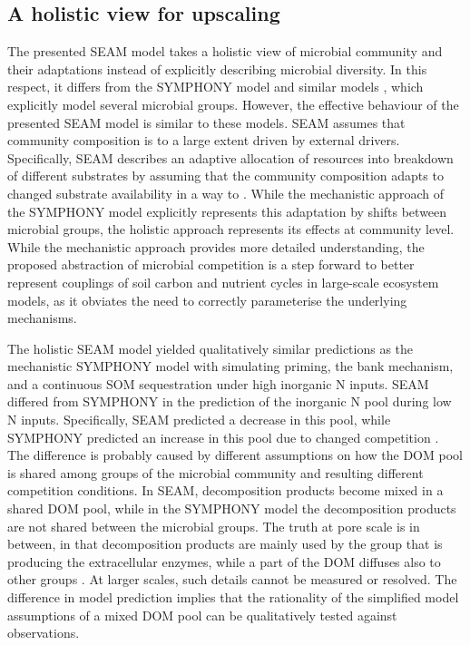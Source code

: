 \subsection{A holistic view for upscaling}
\label{sec:Holistic}

The presented SEAM model takes a holistic view \citep{Panikov10} of microbial
community and their adaptations instead of explicitly describing microbial
diversity.
In this respect, it differs from the SYMPHONY model \citep{Perveen14} and
similar models \citep{Fontaine03}, which explicitly model several microbial
groups.
However, the effective behaviour of the presented SEAM model is similar to these
models.
SEAM assumes that community composition is to a large extent driven by external
drivers. Specifically, SEAM describes an adaptive allocation of resources into
breakdown of different substrates by assuming that the community composition
adapts to changed substrate availability in a way to .
While the mechanistic approach of the SYMPHONY model explicitly represents this
adaptation by shifts between microbial groups, the holistic approach represents
its effects at community level. While the mechanistic approach provides more
detailed understanding, the proposed abstraction of microbial competition is a
step forward to better represent couplings of soil carbon and nutrient cycles in
large-scale ecosystem models, as it obviates the need to correctly parameterise
the underlying mechanisms.

The holistic SEAM model yielded qualitatively similar predictions as the
mechanistic SYMPHONY model with simulating priming, the bank mechanism, and a
continuous SOM sequestration under high inorganic N inputs. SEAM differed from
SYMPHONY in the prediction of the inorganic N pool during low N inputs.
Specifically, SEAM predicted a decrease in this pool, while SYMPHONY predicted an
increase in this pool due to changed competition \citep{Perveen14}. The
difference is probably caused by different assumptions on how the DOM pool is
shared among groups of the microbial community and resulting different
competition conditions. In SEAM, decomposition products become mixed
in a shared DOM pool, while in the SYMPHONY model the decomposition products are
not shared between the microbial groups.
The truth at pore scale is in between, in that decomposition products are mainly
used by the group that is producing the extracellular enzymes, while a part of
the DOM diffuses also to other groups \citep{Kaiser14}. At larger scales, such
details cannot be measured or resolved. The difference in model prediction
implies that the rationality of the simplified model assumptions of a mixed
DOM pool can be qualitatively tested against observations. 

